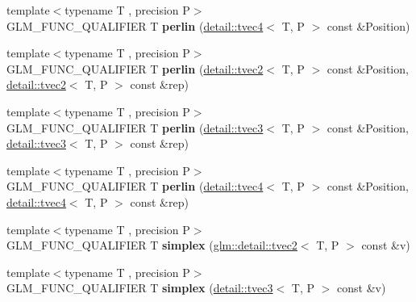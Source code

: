 \begin{DoxyCompactItemize}
\item 
{\footnotesize template$<$typename T , precision P$>$ }\\G\+L\+M\+\_\+\+F\+U\+N\+C\+\_\+\+Q\+U\+A\+L\+I\+F\+I\+ER T {\bfseries perlin} (\hyperlink{structglm_1_1detail_1_1tvec4}{detail\+::tvec4}$<$ T, P $>$ const \&Position)\hypertarget{namespaceglm_ac5aa8a72ead80436e891284db02a2f20}{}\label{namespaceglm_ac5aa8a72ead80436e891284db02a2f20}

\item 
{\footnotesize template$<$typename T , precision P$>$ }\\G\+L\+M\+\_\+\+F\+U\+N\+C\+\_\+\+Q\+U\+A\+L\+I\+F\+I\+ER T {\bfseries perlin} (\hyperlink{structglm_1_1detail_1_1tvec2}{detail\+::tvec2}$<$ T, P $>$ const \&Position, \hyperlink{structglm_1_1detail_1_1tvec2}{detail\+::tvec2}$<$ T, P $>$ const \&rep)\hypertarget{namespaceglm_aa7529608f67b6200929a30cc5e3f5c71}{}\label{namespaceglm_aa7529608f67b6200929a30cc5e3f5c71}

\item 
{\footnotesize template$<$typename T , precision P$>$ }\\G\+L\+M\+\_\+\+F\+U\+N\+C\+\_\+\+Q\+U\+A\+L\+I\+F\+I\+ER T {\bfseries perlin} (\hyperlink{structglm_1_1detail_1_1tvec3}{detail\+::tvec3}$<$ T, P $>$ const \&Position, \hyperlink{structglm_1_1detail_1_1tvec3}{detail\+::tvec3}$<$ T, P $>$ const \&rep)\hypertarget{namespaceglm_adc2ed67b3bf55ef9fcf95dae1b980148}{}\label{namespaceglm_adc2ed67b3bf55ef9fcf95dae1b980148}

\item 
{\footnotesize template$<$typename T , precision P$>$ }\\G\+L\+M\+\_\+\+F\+U\+N\+C\+\_\+\+Q\+U\+A\+L\+I\+F\+I\+ER T {\bfseries perlin} (\hyperlink{structglm_1_1detail_1_1tvec4}{detail\+::tvec4}$<$ T, P $>$ const \&Position, \hyperlink{structglm_1_1detail_1_1tvec4}{detail\+::tvec4}$<$ T, P $>$ const \&rep)\hypertarget{namespaceglm_aae37c0aec171d76dc3ca061fe4ee8a9c}{}\label{namespaceglm_aae37c0aec171d76dc3ca061fe4ee8a9c}

\item 
{\footnotesize template$<$typename T , precision P$>$ }\\G\+L\+M\+\_\+\+F\+U\+N\+C\+\_\+\+Q\+U\+A\+L\+I\+F\+I\+ER T {\bfseries simplex} (\hyperlink{structglm_1_1detail_1_1tvec2}{glm\+::detail\+::tvec2}$<$ T, P $>$ const \&v)\hypertarget{namespaceglm_abdfacc8dd98029ebf09c0a4a1ed505f5}{}\label{namespaceglm_abdfacc8dd98029ebf09c0a4a1ed505f5}

\item 
{\footnotesize template$<$typename T , precision P$>$ }\\G\+L\+M\+\_\+\+F\+U\+N\+C\+\_\+\+Q\+U\+A\+L\+I\+F\+I\+ER T {\bfseries simplex} (\hyperlink{structglm_1_1detail_1_1tvec3}{detail\+::tvec3}$<$ T, P $>$ const \&v)\hypertarget{namespaceglm_aa95d7bc123a0a077dc7f015333e2d674}{}\label{namespaceglm_aa95d7bc123a0a077dc7f015333e2d674}


\end{DoxyCompactItemize}
